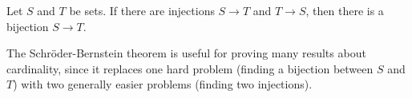 \documentclass[12pt]{article}
\begin{document}

Let $S$ and $T$ be sets.
If there are injections $S \to T$ and $T \to S$,
then there is a bijection $S\to T$.

The Schr\"oder-Bernstein theorem is useful
for proving many results about cardinality,
since it replaces one hard problem (finding a bijection between $S$ and $T$)
with two generally easier problems (finding two injections).
\end{document}

